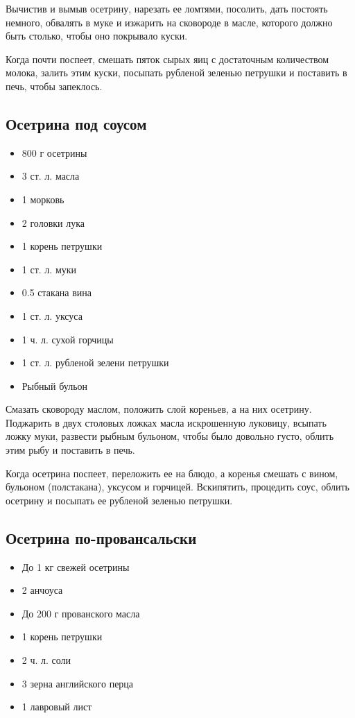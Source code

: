Вычистив и вымыв осетрину, нарезать ее ломтями, посолить, дать постоять немного, обвалять в муке и изжарить на сковороде в масле, которого должно быть столько, чтобы оно покрывало куски.

Когда почти поспеет, смешать пяток сырых яиц с достаточным количеством молока, залить этим куски, посыпать рубленой зеленью петрушки и поставить в печь, чтобы запеклось.

\subsection{Осетрина под соусом}

\begin{itemize} 
	\item  800 г осетрины 
    \item  3 ст. л. масла 
    \item  1 морковь 
    \item  2 головки лука 
    \item  1 корень петрушки 
    \item  1 ст. л. муки 
    \item  0.5 стакана вина 
    \item  1 ст. л. уксуса 
    \item  1 ч. л. сухой горчицы 
    \item  1 ст. л. рубленой зелени петрушки 
    \item  Рыбный бульон
\end{itemize}

Смазать сковороду маслом, положить слой кореньев, а на них осетрину. Поджарить в двух столовых ложках масла искрошенную луковицу, всыпать ложку муки, развести рыбным бульоном, чтобы было довольно густо, облить этим рыбу и поставить в печь.

Когда осетрина поспеет, переложить ее на блюдо, а коренья смешать с вином, бульоном (полстакана), уксусом и горчицей. Вскипятить, процедить соус, облить осетрину и посыпать ее рубленой зеленью петрушки.

\subsection{Осетрина по-провансальски}

\begin{itemize} 
	\item  До 1 кг свежей осетрины 
    \item  2 анчоуса 
    \item  До 200 г прованского масла 
    \item  1 корень петрушки 
    \item  2 ч. л. соли 
    \item  3 зерна английского перца 
    \item  1 лавровый лист
\end{itemize}

